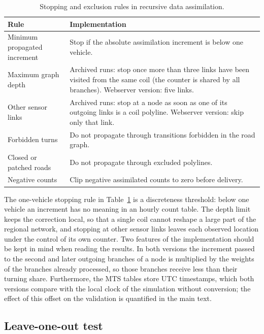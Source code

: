 \documentclass[11pt,a4paper]{article}
\begin{document}
\begin{table}[htbp]
\centering
\caption{Stopping and exclusion rules in recursive data assimilation.}
\label{tab:correction-rules}
\begin{tabularx}{\linewidth}{@{}lX@{}}
\toprule
Rule & Implementation \\
\midrule
Minimum propagated increment & Stop if the absolute assimilation increment is below one
vehicle. \\
Maximum graph depth & Archived runs: stop once more than three links have been visited from the same coil (the counter is shared by all branches). Webserver version: five links. \\
Other sensor links & Archived runs: stop at a node as soon as one of its outgoing links is a coil polyline. Webserver version: skip only that link. \\
Forbidden turns & Do not propagate through transitions forbidden in the road
graph. \\
Closed or patched roads & Do not propagate through excluded polylines. \\
Negative counts & Clip negative assimilated counts to zero before delivery. \\
\bottomrule
\end{tabularx}
\end{table}

The one-vehicle stopping rule in Table~\ref{tab:correction-rules} is a discreteness threshold: below one vehicle an increment has no meaning in an hourly count table. The depth limit keeps the correction local, so that a single coil cannot reshape a large part of the regional network, and stopping at other sensor links leaves each observed location under the control of its own counter. Two features of the implementation should be kept in mind when reading the results. In both versions the increment passed to the second and later outgoing branches of a node is multiplied by the weights of the branches already processed, so those branches receive less than their turning share. Furthermore, the MTS tables store UTC timestamps, which both versions compare with the local clock of the simulation without conversion; the effect of this offset on the validation is quantified in the main text.

\subsection{Leave-one-out test}
\end{document}
